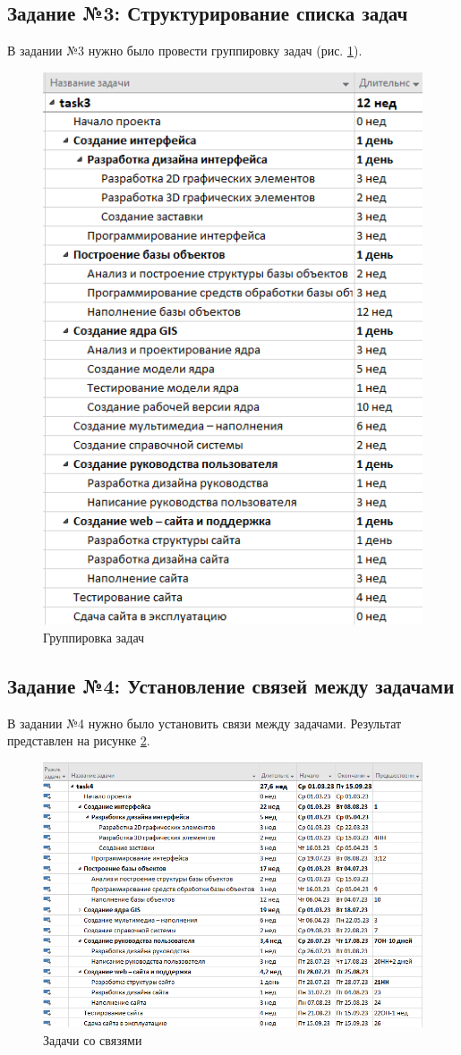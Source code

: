 \subsection*{Задание №3: Структурирование списка задач}
В задании №3 нужно было провести группировку задач (рис. \ref{p7}).
\begin{figure}[!h]
	\centering
	\includegraphics[width=0.7\linewidth]{inc/img/7.png}
	\caption{Группировка задач}
	\label{p7}
\end{figure}

\newpage
\subsection*{Задание №4: Установление связей между задачами}
В задании №4 нужно было установить связи между задачами. Результат представлен на рисунке \ref{p8}.
\begin{figure}[!h]
	\centering
	\includegraphics[width=1\linewidth]{inc/img/8.png}
	\caption{Задачи со связями}
	\label{p8}
\end{figure}

